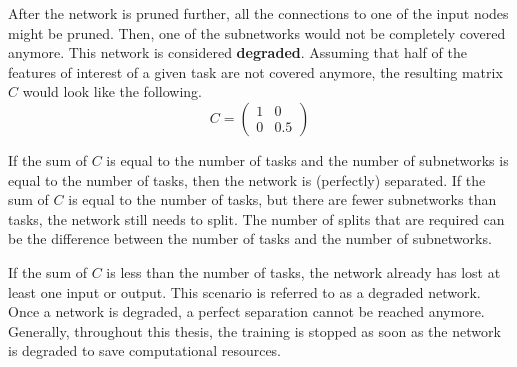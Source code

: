 After the network is pruned further, all the connections to one of the input nodes might be pruned.
Then, one of the subnetworks would not be completely covered anymore.
This network is considered \textbf{degraded}.
Assuming that half of the features of interest of a given task are not covered anymore, the resulting matrix $C$ would look like the following.
\[ C = \begin{pmatrix} 1 & 0 \\ 0 & 0.5 \end{pmatrix} \]

If the sum of $C$ is equal to the number of tasks and the number of subnetworks is equal to the number of tasks, then the network is (perfectly) separated.
If the sum of $C$ is equal to the number of tasks, but there are fewer subnetworks than tasks, the network still needs to split.
The number of splits that are required can be the difference between the number of tasks and the number of subnetworks.

If the sum of $C$ is less than the number of tasks, the network already has lost at least one input or output.
This scenario is referred to as a degraded network.
Once a network is degraded, a perfect separation cannot be reached anymore.
Generally, throughout this thesis, the training is stopped as soon as the network is degraded to save computational resources.
